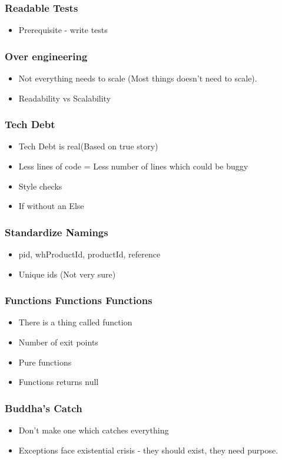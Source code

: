 \documentclass{beamer}
\begin{document}
\begin{frame}[fragile]
\frametitle{Readable Tests}
\begin{itemize}
	\item Prerequisite - write tests
\end{itemize}
\end{frame}

\begin{frame}[fragile]
\frametitle{Over engineering}
\begin{itemize}
	\item Not everything needs to scale (Most things doesn't need to scale).
	\item Readability vs Scalability
\end{itemize}
\end{frame}

\begin{frame}[fragile]
\frametitle{Tech Debt}
\begin{itemize}
	\item Tech Debt is real(Based on true story)
	\item Less lines of code = Less number of lines which could be buggy
	\item Style checks
	\item If without an Else
\end{itemize}
\end{frame}

\begin{frame}[fragile]
\frametitle{Standardize Namings}
\begin{itemize}
	\item pid, whProductId, productId, reference
	\item Unique ids (Not very sure)
\end{itemize}
\end{frame}

\begin{frame}[fragile]
\frametitle{Functions Functions Functions}
\begin{itemize}
	\item There is a thing called function
	\item Number of exit points
	\item Pure functions
	\item Functions returns null
\end{itemize}
\end{frame}

\begin{frame}[fragile]
\frametitle{Buddha's Catch}
\begin{itemize}
	\item Don't make one which catches everything
	\item Exceptions face existential crisis - they should exist, they need purpose.
\end{itemize}
\end{frame}
\end{document}
